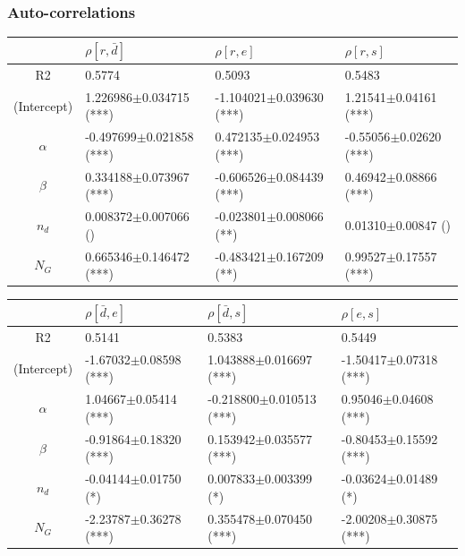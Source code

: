 \subsubsection*{Auto-correlations}

\begin{center}

\begin{tabular}{|c|p{3.7cm}|p{3.7cm}|p{3.7cm}|}
 \hline
&$\rho[r,\bar{d}]$&$\rho[r,e]$&$\rho[r,s]$\\\hline
R2&0.5774&0.5093&0.5483\\\hline
(Intercept)&1.226986$\pm$0.034715 (***)&-1.104021$\pm$0.039630 (***)&1.21541$\pm$0.04161 (***)\\
$\alpha$&-0.497699$\pm$0.021858 (***)&0.472135$\pm$0.024953 (***)&-0.55056$\pm$0.02620 (***)\\
$\beta$&0.334188$\pm$0.073967 (***)&-0.606526$\pm$0.084439 (***)&0.46942$\pm$0.08866 (***)\\
$n_d$&0.008372$\pm$0.007066 ()&-0.023801$\pm$0.008066 (**)&0.01310$\pm$0.00847 ()\\
$N_G$&0.665346$\pm$0.146472 (***)&-0.483421$\pm$0.167209 (**)&0.99527$\pm$0.17557 (***)\\
\hline
\end{tabular}

\bigskip

\begin{tabular}{|c|p{3.7cm}|p{3.7cm}|p{3.7cm}|}
 \hline
&$\rho[\bar{d},e]$&$\rho[\bar{d},s]$&$\rho[e,s]$\\\hline
R2&0.5141&0.5383&0.5449\\\hline
(Intercept)&-1.67032$\pm$0.08598 (***)&1.043888$\pm$0.016697 (***)&-1.50417$\pm$0.07318 (***)\\
$\alpha$&1.04667$\pm$0.05414 (***)&-0.218800$\pm$0.010513 (***)&0.95046$\pm$0.04608 (***)\\
$\beta$&-0.91864$\pm$0.18320 (***)&0.153942$\pm$0.035577 (***)&-0.80453$\pm$0.15592 (***)\\
$n_d$&-0.04144$\pm$0.01750 (*)&0.007833$\pm$0.003399 (*)&-0.03624$\pm$0.01489 (*)\\
$N_G$&-2.23787$\pm$0.36278 (***)&0.355478$\pm$0.070450 (***)&-2.00208$\pm$0.30875 (***)\\
 \hline
\end{tabular}



\bigskip


\end{center}
